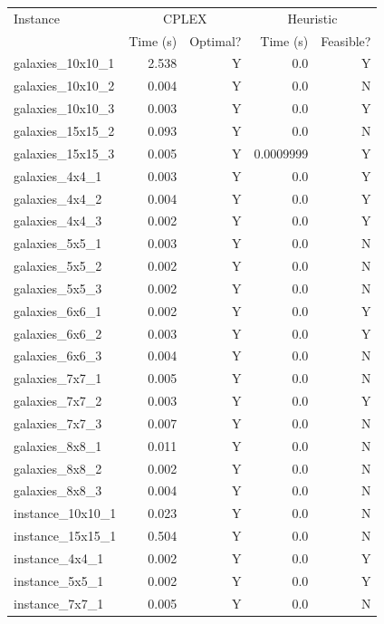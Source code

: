 \documentclass{article}
\begin{document}
\begin{table}[h]
\centering
\begin{tabular}{lrrrr}
\toprule
Instance & \multicolumn{2}{c}{CPLEX} & \multicolumn{2}{c}{Heuristic} \\
          & Time (s) & Optimal? & Time (s) & Feasible? \\
\midrule
galaxies\_10x10\_1 & 2.538 & Y & 0.0 & Y \\
galaxies\_10x10\_2 & 0.004 & Y & 0.0 & N \\
galaxies\_10x10\_3 & 0.003 & Y & 0.0 & Y \\
galaxies\_15x15\_2 & 0.093 & Y & 0.0 & N \\
galaxies\_15x15\_3 & 0.005 & Y & 0.0009999 & Y \\
galaxies\_4x4\_1 & 0.003 & Y & 0.0 & Y \\
galaxies\_4x4\_2 & 0.004 & Y & 0.0 & Y \\
galaxies\_4x4\_3 & 0.002 & Y & 0.0 & Y \\
galaxies\_5x5\_1 & 0.003 & Y & 0.0 & N \\
galaxies\_5x5\_2 & 0.002 & Y & 0.0 & N \\
galaxies\_5x5\_3 & 0.002 & Y & 0.0 & N \\
galaxies\_6x6\_1 & 0.002 & Y & 0.0 & Y \\
galaxies\_6x6\_2 & 0.003 & Y & 0.0 & Y \\
galaxies\_6x6\_3 & 0.004 & Y & 0.0 & N \\
galaxies\_7x7\_1 & 0.005 & Y & 0.0 & N \\
galaxies\_7x7\_2 & 0.003 & Y & 0.0 & Y \\
galaxies\_7x7\_3 & 0.007 & Y & 0.0 & N \\
galaxies\_8x8\_1 & 0.011 & Y & 0.0 & N \\
galaxies\_8x8\_2 & 0.002 & Y & 0.0 & N \\
galaxies\_8x8\_3 & 0.004 & Y & 0.0 & N \\
instance\_10x10\_1 & 0.023 & Y & 0.0 & N \\
instance\_15x15\_1 & 0.504 & Y & 0.0 & N \\
instance\_4x4\_1 & 0.002 & Y & 0.0 & Y \\
instance\_5x5\_1 & 0.002 & Y & 0.0 & Y \\
instance\_7x7\_1 & 0.005 & Y & 0.0 & N \\
\bottomrule
\end{tabular}
\label{tab:galaxies-results}
\end{table}
\end{document}
